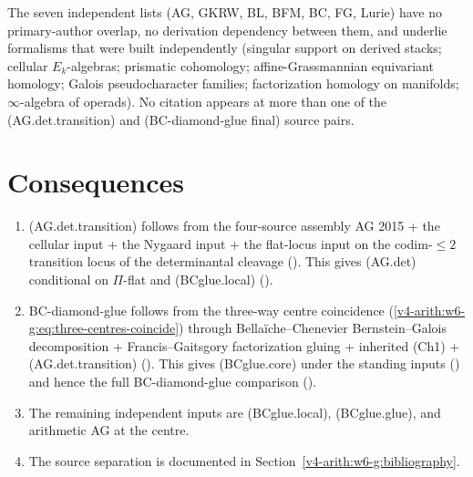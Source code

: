 The seven independent lists
(AG, GKRW, BL, BFM, BC, FG, Lurie) have no primary-author overlap,
no derivation dependency between them, and underlie formalisms
that were built independently (singular support on derived stacks;
cellular \(E_{k}\)-algebras; prismatic cohomology; affine-Grassmannian
equivariant homology; Galois pseudocharacter families; factorization
homology on manifolds; \(\infty\)-algebra of operads). No citation
appears at more than one of the (AG.det.transition) and
(BC-diamond-glue final) source pairs.

\section{Consequences}
\label{v4-arith:w6-g:summary}

\begin{enumerate}
\item (AG.det.transition) follows from the four-source assembly
AG 2015 + the cellular input + the Nygaard input + the flat-locus input
on the codim-\(\leq 2\)
transition locus of the determinantal cleavage
(). This gives
(AG.det) conditional on \(\Pi\)-flat and (BCglue.local)
().
\item BC-diamond-glue follows from the three-way centre
coincidence
(\ref{v4-arith:w6-g:eq:three-centres-coincide})
through Bella\"iche--Chenevier Bernstein--Galois decomposition +
Francis--Gaitsgory factorization gluing + inherited (Ch1) +
(AG.det.transition) ().
This gives (BCglue.core) under the standing inputs
() and hence the full
BC-diamond-glue comparison ().
\item The remaining independent inputs are (BCglue.local),
(BCglue.glue), and arithmetic AG at the centre.
\item The source separation is documented in
Section~\ref{v4-arith:w6-g:bibliography}.
\end{enumerate}
